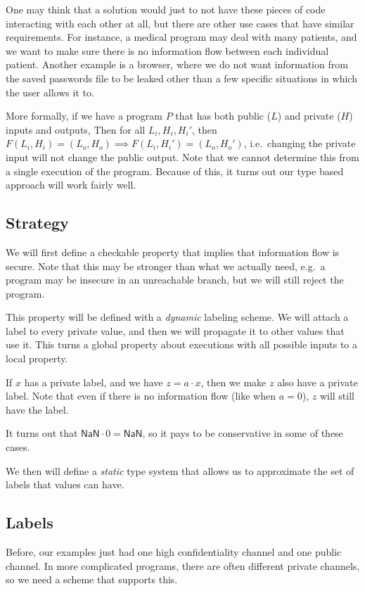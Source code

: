 \documentclass[class=scrartcl]{standalone}
\begin{document}
One may think that a solution would just to not have these
pieces of code interacting with each other at all,
but there are other use cases that have similar requirements.
For instance, a medical program may deal with many patients,
and we want to make sure there is no information flow between each
individual patient.
Another example is a browser, where we do not want information
from the saved passwords file to be leaked other than
a few specific situations in which the user allows it to.

More formally, if we have a program \(P\) that has both
public (\(L\)) and private (\(H\)) inputs and outputs,
Then for all \(L_i, H_i, H_i'\),
then \(F(L_i, H_i) = (L_o, H_o) \implies F(L_i, H_i') = (L_o, H_o')\),
i.e.\ changing the private input will not change the public output.
Note that we cannot determine this from a single execution of the program.
Because of this, it turns out our type based approach will work fairly well.

\subsection{Strategy}
We will first define a checkable property that implies
that information flow is secure.
Note that this may be stronger than what we actually need,
e.g.\ a program may be insecure in an unreachable branch,
but we will still reject the program.

This property will be defined with a \emph{dynamic} labeling scheme.
We will attach a label to every private value,
and then we will propagate it to other values that use it.
This turns a global property about executions with all possible inputs
to a local property.

\begin{example}
  If \(x\) has a private label, and we have \(z = a \cdot x\),
  then we make \(z\) also have a private label.
  Note that even if there is no information flow (like when \(a = 0\)),
  \(z\) will still have the label.

  It turns out that \(\textsf{NaN} \cdot 0 = \textsf{NaN}\),
  so it pays to be conservative in some of these cases.
\end{example}

We then will define a \emph{static} type system that allows us to
approximate the set of labels that values can have.

\subsection{Labels}
Before, our examples just had
one high confidentiality channel and one public channel.
In more complicated programs, there are often different private channels,
so we need a scheme that supports this.
\end{document}
